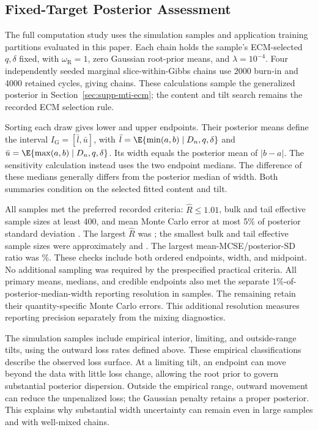 \subsection{Fixed-Target Posterior Assessment}
\label{sec:supp-mti-posterior-assessment}

The full computation study uses the \MTIFullSimulations{} simulation samples
and \MTIFullApplications{} application training partitions evaluated in this
paper. Each chain holds the sample's ECM-selected \(q,\delta\) fixed, with
\(\omega_{\mathrm R}=1\), zero Gaussian root-prior means, and
\(\lambda=10^{-4}\). Four independently seeded marginal
slice-within-Gibbs chains use 2000 burn-in and 4000 retained cycles, giving
\MTIFullChains{} chains. These calculations sample the generalized
posterior in Section~\ref{sec:supp-mti-ecm}; the content and
tilt search remains the recorded ECM selection rule.

Sorting each draw gives lower and upper endpoints. Their posterior means
define the interval \(I_{\mathrm G}=[\bar l,\bar u]\), with
\(\bar l=\E\{\min(a,b)\mid D_n,q,\delta\}\) and
\(\bar u=\E\{\max(a,b)\mid D_n,q,\delta\}\).
Its width equals the posterior mean of \(|b-a|\).
The sensitivity calculation instead uses the two endpoint medians. The
difference of these medians generally differs from the posterior median
of width. Both summaries condition on the selected fitted content and tilt.

All \MTIFullDatasets{} samples met the preferred recorded criteria:
\(\widehat R\le1.01\), bulk and tail effective sample sizes at least 400,
and mean Monte Carlo error at most 5\% of posterior standard deviation
\citep{VehtariEtAl2021Rhat}. The largest \(\widehat R\) was
\MTIFullRhat{}; the smallest bulk and tail effective sample sizes were
approximately \MTIFullBulkESS{} and \MTIFullTailESS{}.
The largest mean-MCSE/posterior-SD ratio was \MTIFullMaximumMCSE\%.
These checks include both ordered endpoints, width, and midpoint.
No additional sampling was required by the prespecified practical criteria.
All primary means, medians, and credible endpoints also met the separate
1\%-of-posterior-median-width reporting resolution in \MTIFullPrecision{}
samples. The remaining \MTIFullPrecisionOther{} retain their
quantity-specific Monte Carlo errors. This additional resolution measures
reporting precision separately from the mixing diagnostics.

The simulation samples include \MTIFullInterior{} empirical interior,
\MTIFullLimiting{} limiting, and \MTIFullOutside{} outside-range tilts,
using the outward loss rates defined above. These empirical classifications
describe the observed loss surface. At a limiting tilt, an endpoint can
move beyond the data with little loss change, allowing the root prior to
govern substantial posterior dispersion. Outside the empirical range,
outward movement can reduce the unpenalized loss; the Gaussian penalty
retains a proper posterior. This explains why substantial width uncertainty
can remain even in large samples and with well-mixed chains.

